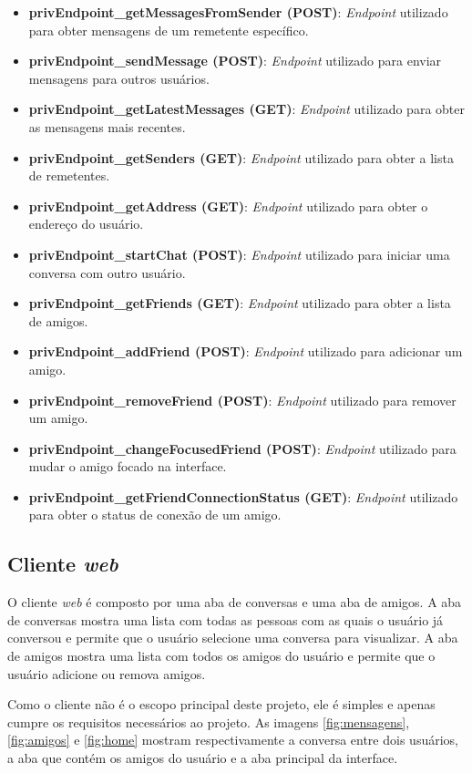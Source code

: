 \begin{itemize}
\item \textbf{privEndpoint\_getMessagesFromSender (POST)}: \textit{Endpoint} utilizado para obter mensagens de um remetente específico.
\item \textbf{privEndpoint\_sendMessage (POST)}: \textit{Endpoint} utilizado para enviar mensagens para outros usuários.
\item \textbf{privEndpoint\_getLatestMessages (GET)}: \textit{Endpoint} utilizado para obter as mensagens mais recentes.
\item \textbf{privEndpoint\_getSenders (GET)}: \textit{Endpoint} utilizado para obter a lista de remetentes.
\item \textbf{privEndpoint\_getAddress (GET)}: \textit{Endpoint} utilizado para obter o endereço do usuário.
\item \textbf{privEndpoint\_startChat (POST)}: \textit{Endpoint} utilizado para iniciar uma conversa com outro usuário.
\item \textbf{privEndpoint\_getFriends (GET)}: \textit{Endpoint} utilizado para obter a lista de amigos.
\item \textbf{privEndpoint\_addFriend (POST)}: \textit{Endpoint} utilizado para adicionar um amigo.
\item \textbf{privEndpoint\_removeFriend (POST)}: \textit{Endpoint} utilizado para remover um amigo.
\item \textbf{privEndpoint\_changeFocusedFriend (POST)}: \textit{Endpoint} utilizado para mudar o amigo focado na interface.
\item \textbf{privEndpoint\_getFriendConnectionStatus (GET)}: \textit{Endpoint} utilizado para obter o status de conexão de um amigo.
\end{itemize}

\subsection{Cliente \textit{web}}

O cliente \textit{web} é composto por uma aba de conversas e uma aba de amigos. A aba de conversas mostra uma lista com todas as pessoas com as quais o usuário já conversou e permite que o usuário selecione uma conversa para visualizar. A aba de amigos mostra uma lista com todos os amigos do usuário e permite que o usuário adicione ou remova amigos.

Como o cliente não é o escopo principal deste projeto, ele é simples e apenas cumpre os requisitos necessários ao projeto. As imagens \ref{fig:mensagens}, \ref{fig:amigos} e \ref{fig:home} mostram respectivamente a conversa entre dois usuários, a aba que contém os amigos do usuário e a aba principal da interface.

